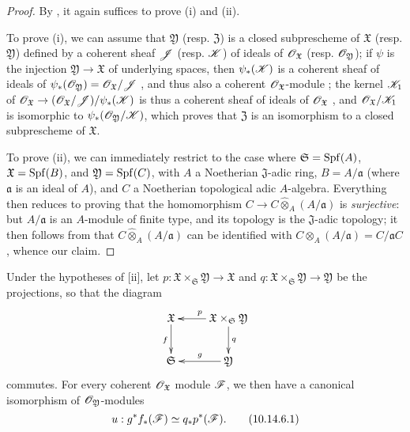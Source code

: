 \begin{proof}
\label{proof-1.10.14.5}
By , it again suffices to prove (i) and (ii).

To prove (i), we can assume that $\mathfrak{Y}$ (resp. $\mathfrak{Z}$) is a closed subprescheme of $\mathfrak{X}$ (resp. $\mathfrak{Y}$) defined by a coherent sheaf $\mathscr{J}$ (resp. $\mathscr{K}$) of ideals of $\mathscr{O}_\mathfrak{X}$ (resp. $\mathscr{O}_\mathfrak{Y}$);
if $\psi$ is the injection $\mathfrak{Y}\to\mathfrak{X}$ of underlying spaces, then $\psi_*(\mathscr{K})$ is a coherent sheaf of ideals of $\psi_*(\mathscr{O}_\mathfrak{Y})=\mathscr{O}_\mathfrak{X}/\mathscr{J}$ , and thus also a coherent $\mathscr{O}_\mathfrak{X}$-module ;
the kernel $\mathscr{K}_1$ of $\sh{O}_\mathfrak{X}\to(\sh{O}_\mathfrak{X}/\sh{J})/\psi_*(\sh{K})$ is thus a coherent sheaf of ideals of $\mathscr{O}_\mathfrak{X}$ , and $\mathscr{O}_\mathfrak{X}/\mathscr{K}_1$ is isomorphic to $\psi_*(\mathscr{O}_\mathfrak{Y}/\mathscr{K})$, which proves that $\mathfrak{Z}$ is an isomorphism to a closed subprescheme of $\mathfrak{X}$.

To prove (ii), we can immediately restrict to the case where $\mathfrak{S}=\operatorname{Spf}(A)$, $\mathfrak{X}=\operatorname{Spf}(B)$, and $\mathfrak{Y}=\operatorname{Spf}(C)$, with $A$ a Noetherian $\mathfrak{J}$-adic ring, $B=A/\mathfrak{a}$ (where $\mathfrak{a}$ is an ideal of $A$), and $C$ a Noetherian topological adic $A$-algebra.
Everything then reduces to proving that the homomorphism $C\to C\widehat{\otimes}_A(A/\mathfrak{a})$ is \emph{surjective}:
but $A/\mathfrak{a}$ is an $A$-module of finite type, and its topology is the $\mathfrak{J}$-adic topology;
it then follows from  that $C\widehat{\otimes}_A(A/\mathfrak{a})$ can be identified with $C\otimes_A(A/\mathfrak{a})=C/\mathfrak{a}C$, whence our claim.
\end{proof}

\begin{corollary}[10.14.6]
\label{1.10.14.6}
Under the hypotheses of [ii], let $p:\mathfrak{X}\times_\mathfrak{S}\mathfrak{Y}\to\mathfrak{X}$ and $q:\mathfrak{X}\times_\mathfrak{S}\mathfrak{Y}\to\mathfrak{Y}$ be the projections, so that the diagram
\[
  \xymatrix{
    \mathfrak{X}\ar[d]_f &
    \mathfrak{X}\times_\mathfrak{S}\mathfrak{Y}\ar[l]_p\ar[d]^q\\
    \mathfrak{S} &
    \mathfrak{Y}\ar[l]_g
  }
\]
commutes.
For every coherent $\mathscr{O}_\mathfrak{X}$ module $\mathscr{F}$, we then have a canonical isomorphism of $\mathscr{O}_\mathfrak{Y}$-modules
\begin{equation*}
\label{1.10.14.6.1}
  u:g^*f_*(\mathscr{F})\simeq q_*p^*(\mathscr{F}).
  \tag{10.14.6.1}
\end{equation*}
\end{corollary}

